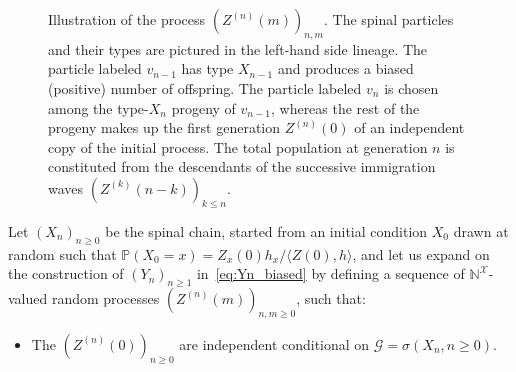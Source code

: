 \begin{refsegment}
\begin{figure}
{
}
\caption{Illustration of the process $(Z^{(n)}(m))_{n,m}$. The
    spinal particles and their types are pictured in the left-hand
    side lineage. The particle labeled $v_{n-1}$ has type $X_{n-1}$ and
    produces a biased (positive) number of offspring. The particle
    labeled $v_n$ is chosen among the type-$X_n$ progeny of $v_{n-1}$,
    whereas the rest of the progeny makes up the first generation
    $Z^{(n)}(0)$ of an independent copy of the initial process. The
    total population at generation $n$ is constituted from the
    descendants of the successive immigration waves
    $(Z^{(k)}(n-k))_{k\leq n}$.} \label{fig:spine}
\end{figure}
Let $(X_n)_{n\geq 0}$ be the spinal chain, started from an initial
condition $X_0$ drawn at random such that $\mathbb{P}(X_0=x) = Z_x(0)h_x/\langle Z(0), h\rangle$, and let us expand on the construction of $(Y_n)_{n\geq 1}$ in~\eqref{eq:Yn_biased} by defining a sequence of $\mathbb{N}^{\mathcal{X}}$-valued random processes $(Z^{(n)}(m))_{n,m\geq 0}$, such that:
\begin{itemize}
  \item The $(Z^{(n)}(0))_{n\geq 0}$ are independent conditional on $\mathcal{G}=\sigma(X_n,n\geq 0)$.

\end{itemize}
\end{refsegment}
